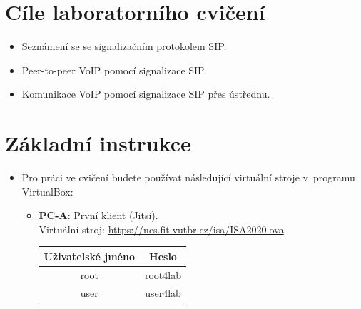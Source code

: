 \section*{Cíle laboratorního cvičení}
\begin{itemize}
  \item Seznámení se se signalizačním protokolem SIP.
  \item Peer-to-peer VoIP pomocí signalizace SIP.
  \item Komunikace VoIP pomocí signalizace SIP přes ústřednu.
\end{itemize}

\section*{Základní instrukce}
\begin{itemize}
  \item Pro práci ve cvičení budete používat následující virtuální stroje v~programu VirtualBox:
  \begin{itemize}
	\item \textbf{PC-A}: První klient (Jitsi).\\
	Virtuální stroj: \url{https://nes.fit.vutbr.cz/isa/ISA2020.ova}
	\begin{table}[H]
		\centering
		\begin{tabular}{|c|c|}
		\hline
		\textbf{Uživatelské jméno} & \textbf{Heslo} \\ \hline
		root                       & root4lab       \\ \hline
		user                       & user4lab       \\ \hline
		\end{tabular}
	\end{table}


\end{itemize}
\end{itemize}
